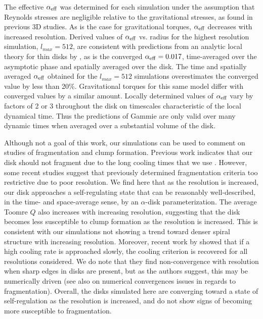 \documentclass[manuscript]{aastex}
\begin{document}
The effective $\alpha_{\rm{eff}}$ was determined for each simulation under the assumption that Reynolds
stresses are negligible relative to the gravitational stresses, as found in previous 3D studies.  As is the
case for gravitational torques, $\alpha_{\rm{eff}}$ decreases with increased resolution.  Derived values of
$\alpha_{\rm{eff}}$ vs. radius for the highest resolution simulation, $l_{max} = 512$, are consistent with
predictions from an analytic local theory for thin disks by \citet{gammie2001}, as is the converged
$\alpha_{\rm{eff}}= 0.017$, time-averaged over the asymptotic phase and spatially averaged over the disk. The
time and spatially averaged $\alpha_{\rm{eff}}$ obtained for the $l_{max} = 512$ simulations overestimates the
converged value by less than 20\%.  Gravitational torques for this same model differ with converged values by
a similar amount.  Locally determined values of $\alpha_{\rm{eff}}$ vary by factors of 2 or 3 throughout the
disk on timescales characteristic of the local dynamical time.  Thus the predictions of Gammie are only valid
over many dynamic times when averaged over a substantial volume of the disk.

Although not a goal of this work, our simulations can be used to comment on studies of fragmentation and clump
formation. Previous work indicates that our disk should not fragment due to the long cooling times that we
use \citep[e.g.,][]{gammie2001, rice2005, mejia2005, boley2008}. However, some recent studies \citep[e.g.,][]{boss2009,meru2011a} suggest that previously determined fragmentation criteria too restrictive due to poor
resolution. We find here that as the resolution is increased, our disk approaches a self-regulating state that
can be reasonably well-described, in the time- and space-average sense, by an $\alpha$-disk
parameterization. The average Toomre $Q$ also increases with increasing resolution, suggesting that the disk
becomes less susceptible to clump formation as the resolution is increased.  This is consistent with our
simulations not showing a trend toward denser spiral structure with increasing resolution. Moreover, recent
work by \citet{paardekooper2011} showed that if a high cooling rate is approached slowly, the
\citet{gammie2001} cooling criterion is recovered for all resolutions considered.  We do note that they find
non-convergence with resolution when sharp edges in disks are present, but as the authors suggest, this may be
numerically driven (see also \citet{lodato2011} on numerical convergences issues in regards to fragmentation). Overall, the disks simulated here are converging toward a state of self-regulation as the
resolution is increased, and do not show signs of becoming more susceptible to fragmentation.
 
\end{document}
